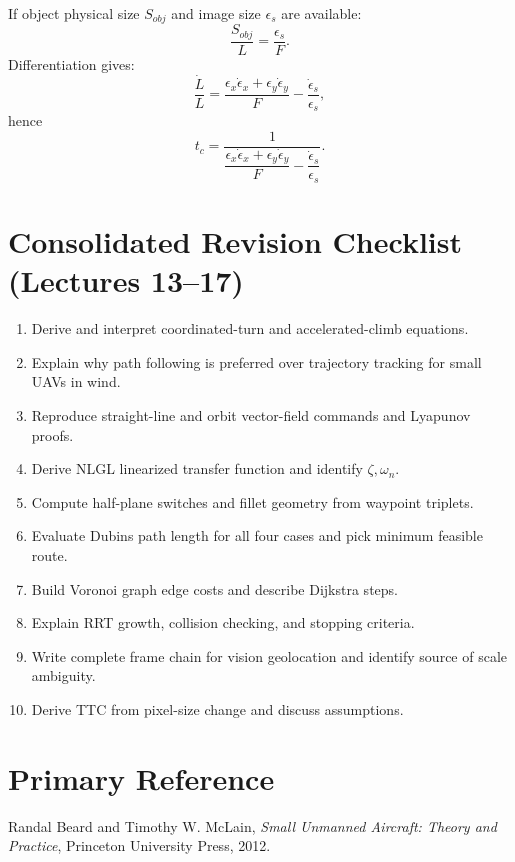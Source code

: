 \documentclass[11pt,a4paper]{article}
\begin{document}
If object physical size $S_{obj}$ and image size $\epsilon_s$ are available:
\[
\frac{S_{obj}}{L}=\frac{\epsilon_s}{F}.
\]
Differentiation gives:
\[
\frac{\dot L}{L}
=\frac{\epsilon_x\dot\epsilon_x+\epsilon_y\dot\epsilon_y}{F}
-\frac{\dot\epsilon_s}{\epsilon_s},
\]
hence
\[
t_c
=\frac{1}{\dfrac{\epsilon_x\dot\epsilon_x+\epsilon_y\dot\epsilon_y}{F}
-\dfrac{\dot\epsilon_s}{\epsilon_s}}.
\]

\newpage
\section{Consolidated Revision Checklist (Lectures 13--17)}
\begin{enumerate}
  \item Derive and interpret coordinated-turn and accelerated-climb equations.
  \item Explain why path following is preferred over trajectory tracking for small UAVs in wind.
  \item Reproduce straight-line and orbit vector-field commands and Lyapunov proofs.
  \item Derive NLGL linearized transfer function and identify $\zeta,\omega_n$.
  \item Compute half-plane switches and fillet geometry from waypoint triplets.
  \item Evaluate Dubins path length for all four cases and pick minimum feasible route.
  \item Build Voronoi graph edge costs and describe Dijkstra steps.
  \item Explain RRT growth, collision checking, and stopping criteria.
  \item Write complete frame chain for vision geolocation and identify source of scale ambiguity.
  \item Derive TTC from pixel-size change and discuss assumptions.
\end{enumerate}

\section*{Primary Reference}
Randal Beard and Timothy W. McLain, \emph{Small Unmanned Aircraft: Theory and Practice}, Princeton University Press, 2012.
\end{document}
